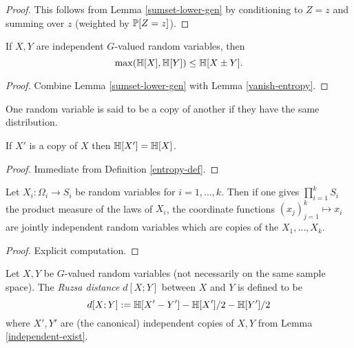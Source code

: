 \begin{proof} \leanok This follows from Lemma \ref{sumset-lower-gen} by conditioning to $Z = z$ and summing over $z$ (weighted by $ \mathbb{P}[Z=z]$).
\end{proof}

\begin{corollary}\label{sumset-lower}
  \leanok
  If $X,Y$ are independent $G$-valued random variables, then
$$\max(\mathbb{H}[X], \mathbb{H}[Y]) \leq \mathbb{H}[X\pm Y].
$$
\end{corollary}

\begin{proof} \leanok Combine Lemma \ref{sumset-lower-gen} with Lemma \ref{vanish-entropy}.
\end{proof}

One random variable is said to be a copy of another if they have the same distribution.

\begin{lemma}\label{copy-ent}
  \leanok
  If $X'$ is a copy of $X$ then $\mathbb{H}[X'] = \mathbb{H}[X]$.
\end{lemma}

\begin{proof}\leanok Immediate from Definition \ref{entropy-def}.
\end{proof}

\begin{lemma}\label{independent-exist}
   \leanok
  Let $X_i : \Omega_i \to S_i$ be random variables for $i=1,\dots,k$.  Then if one gives $\prod_{i=1}^k S_i$ the product measure of the laws of $X_i$, the coordinate functions $(x_j)_{j=1}^k \mapsto x_i$ are jointly independent random variables which are copies of the $X_1,\dots,X_k$.
\end{lemma}

\begin{proof} \leanok
  Explicit computation.
\end{proof}

\begin{definition}\label{ruz-dist-def}
  \leanok
  Let $X,Y$ be $G$-valued random variables (not necessarily on the same sample space).  The \emph{Ruzsa distance} $d[X;Y]$ between $X$ and $Y$ is defined to be
$$ d[X;Y] := \mathbb{H}[X' - Y'] - \mathbb{H}[X']/2 - \mathbb{H}[Y']/2$$
where $X',Y'$ are (the canonical) independent copies of $X,Y$ from Lemma \ref{independent-exist}.
\end{definition}

